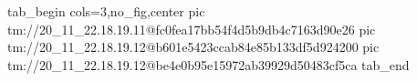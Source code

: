  
 
 
 
 

\qqSecCmtScr


\ifcmt
  tab_begin cols=3,no_fig,center
    pic tm://20_11_22.18.19.11@fc0fea17bb54f4d5b9db4c7163d90e26
    pic tm://20_11_22.18.19.12@b601e5423ccab84e85b133df5d924200
    pic tm://20_11_22.18.19.12@be4e0b95e15972ab39929d50483cf5ca
  tab_end
\fi


